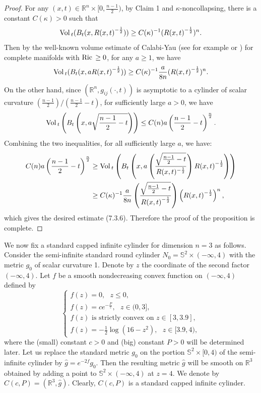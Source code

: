 \begin{proof}
For any $(x,t)\in \mathbb{R}^{n}\times[0,\frac{n-1}{2})$, by Claim
1 and $\kappa$-noncollapsing, there is a constant $C(\kappa)>0$
such that
$$
{\rm Vol}\,_{t}(B_{t}(x,{R(x,t)}^{-\frac{1}{2}}))\geq
C(\kappa)^{-1}({R(x,t)}^{-\frac{1}{2}})^{n}.
$$
Then by the well-known volume estimate of Calabi-Yau (see for
example \cite{Y76} or \cite{ScY}) for complete manifolds with
${\rm Ric}\,\geq 0$, for any $a\geq 1$, we have
$$
{\rm Vol}\,_{t}(B_{t}(x,a{R(x,t)}^{-\frac{1}{2}}))\geq
C(\kappa)^{-1}\frac{a}{8n}({R(x,t)}^{-\frac{1}{2}})^{n}.
$$
On the other hand, since $(\mathbb{R}^{n},g_{ij}(\cdot,t))$ is
asymptotic to a cylinder of scalar curvature
${(\frac{n-1}{2})}/{(\frac{n-1}{2}-t)}$, for sufficiently large
$a>0$, we have
$$
{\rm Vol}\,_{t}\left(B_{t}\left(x,a\sqrt{\frac{n-1}{2}-t}\right)\right)\leq
C(n)a\left(\frac{n-1}{2}-t\right)^{\frac{n}{2}}.
$$
Combining the two inequalities, for  all sufficiently large $a$,
we have:
\begin{align*}
C(n)a\left(\frac{n-1}{2}-t\right)^{\frac{n}{2}}&  \geq
{\rm Vol}\,_{t}\left(B_{t}\left(x,a\left(\frac{\sqrt{\frac{n-1}{2}
-t}}{R(x,t)^{-\frac{1}{2}}}\right){R(x,t)}^{-\frac{1}{2}}\right)\right)\\
&  \geq C(\kappa)^{-1}\frac{a}{8n}\left(\frac{\sqrt{\frac{n-1}{2}
-t}}{{R(x,t)}^{-\frac{1}{2}}}\right) \left({R(x,t)}^{-\frac{1}{2}}\right)^{n},
\end{align*}
which gives the desired estimate (7.3.6). Therefore the proof of
the proposition is complete.
\end{proof}

We now fix a standard capped infinite cylinder for dimension $n=3$
as follows.  Consider the semi-infinite standard round cylinder
$N_0 = \mathbb{S}^2 \times (-\infty,4)$ with the metric $g_0$ of
scalar curvature 1. Denote by $z$ the coordinate of the second
factor $(-\infty,4)$. Let $f$ be a smooth nondecreasing convex
function on $(-\infty,4)$ defined by \begin{equation}
   \left\{
   \begin{array}{lll}
    f(z) = 0, \ \ \ z\leq 0,
         \\[3mm]
    f(z) = ce^{-\frac{P}{z}}, \ \ \ z \in (0,3], \\[3mm]
    f(z) \mbox{ is strictly convex on } z \in [3,3.9], \\[3mm]
    f(z) = -\frac{1}{2}\log(16-z^2), \ \ \ z \in [3.9,4),
\end{array}
\right.         %
\end{equation} where the (small) constant $c>0$ and (big) constant $P>0$ will
be determined later. Let us replace the standard metric $g_0$ on
the portion $\mathbb{S}^2 \times [0,4)$ of the semi-infinite
cylinder by $\hat{g} = e^{-2f}g_0$. Then the resulting metric
$\hat{g}$ will be smooth on $\mathbb{R}^3$ obtained by adding a
point to $\mathbb{S}^2 \times (-\infty,4)$ at $z=4$. We denote by
$C(c,P) = (\mathbb{R}^3,\hat{g})$. Clearly, $C(c,P)$ is a standard
capped infinite cylinder.

